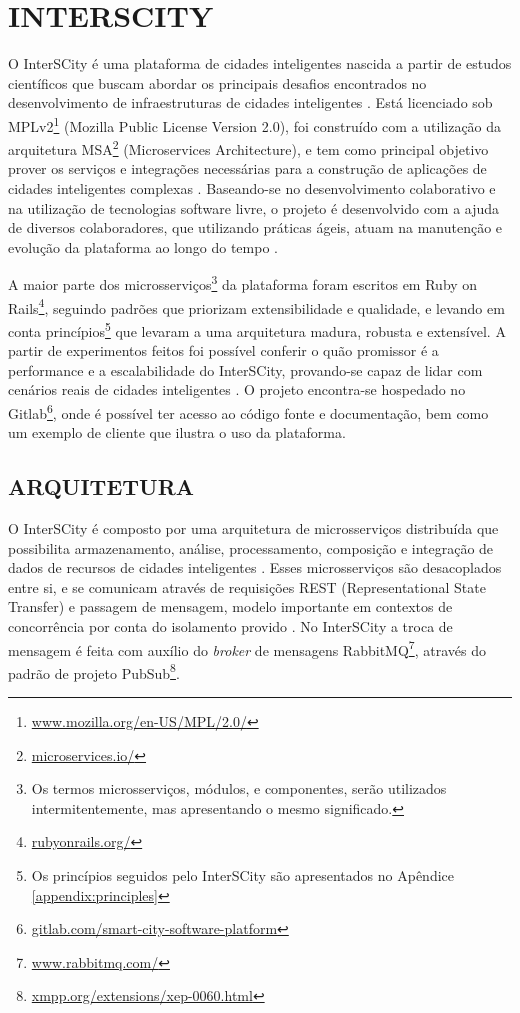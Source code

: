 \chapter[INTERSCITY]{INTERSCITY}
\label{chapter:interscity}

O InterSCity é uma plataforma de cidades inteligentes nascida a partir de
estudos científicos que buscam abordar os principais desafios encontrados
no desenvolvimento de infraestruturas de cidades inteligentes \cite{nof2016}.
Está licenciado sob
MPLv2\footnote{\url{www.mozilla.org/en-US/MPL/2.0/}} (Mozilla Public License
Version 2.0), foi construído com a
utilização da arquitetura MSA\footnote{\url{microservices.io/}} (Microservices
Architecture), e tem como principal objetivo prover os
serviços e integrações necessárias para a construção de aplicações de cidades
inteligentes complexas \cite{delesposte2017}. Baseando-se no desenvolvimento
colaborativo e na utilização de tecnologias software livre, o projeto é
desenvolvido com a ajuda de diversos colaboradores, que utilizando práticas
ágeis, atuam na manutenção e evolução da plataforma ao longo do tempo
\cite{delesposte2017}.

A maior parte dos microsserviços\footnote{Os termos microsserviços, módulos, e
componentes, serão utilizados intermitentemente, mas apresentando o mesmo
significado.} da plataforma foram escritos em Ruby on Rails\footnote{\url{rubyonrails.org/}},
seguindo padrões que priorizam extensibilidade e qualidade, e levando em conta
princípios\footnote{Os princípios seguidos pelo InterSCity são apresentados no
Apêndice \ref{appendix:principles}} que levaram a uma arquitetura madura,
robusta e extensível. A partir de experimentos feitos foi possível conferir
o quão promissor é a performance e a escalabilidade do InterSCity, provando-se
capaz de lidar com cenários reais de cidades inteligentes \cite{delesposte2017}.
O projeto encontra-se hospedado no
Gitlab\footnote{\url{gitlab.com/smart-city-software-platform}},
onde é possível ter acesso ao código fonte e documentação, bem como um exemplo de
cliente que ilustra o uso da plataforma.

\section{ARQUITETURA}
\label{sec:architecture}

O InterSCity é composto por uma arquitetura de microsserviços distribuída
que possibilita armazenamento, análise, processamento, composição e
integração de dados de recursos de cidades inteligentes \cite{delesposte2017}.
Esses microsserviços
são desacoplados entre si, e se comunicam através de requisições REST
(Representational State Transfer) e passagem de mensagem, modelo importante em
contextos de concorrência por conta do isolamento provido \cite{armstrong2003}.
No InterSCity a troca de mensagem é feita com auxílio do \textit{broker} de
mensagens RabbitMQ\footnote{\url{www.rabbitmq.com/}}, através do padrão de
projeto PubSub\footnote{\url{xmpp.org/extensions/xep-0060.html}}.

